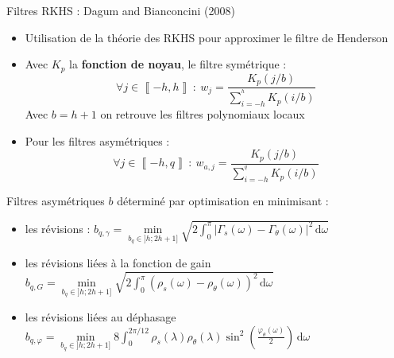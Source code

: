\documentclass[10pt,xcolor=table,color={dvipsnames,usenames},ignorenonframetext,usepdftitle=false,french]{beamer}
\providecommand{\tightlist}{%
  \setlength{\parskip}{0pt}
  }
\newcommand\1{\mathds{1}}
\newcommand\ud{\,\mathrm{d}}
\begin{document}
\begin{frame}{Filtres RKHS : Dagum and Bianconcini (2008)}
\protect\hypertarget{filtres-rkhs-dagum-and-bianconcini-2008}{}
\begin{itemize}
\tightlist
\item
  Utilisation de la théorie des RKHS pour approximer le filtre de
  Henderson
\end{itemize}

\begin{itemize}
\tightlist
\item
  Avec \(K_p\) la \textbf{fonction de noyau}, le filtre symétrique : \[
  \forall j\in\left\llbracket -h,h\right\rrbracket\::\: w_{j}=\frac{K_p(j/b)}{\sum_{i=-h}^{^h}K_p(i/b)}
  \] Avec \(b=h+1\) on retrouve les filtres polynomiaux locaux
\end{itemize}

\pause

\begin{itemize}
\tightlist
\item
  Pour les filtres asymétriques : \[
  \forall j\in\left\llbracket -h,q\right\rrbracket\::\: w_{a,j}=\frac{K_p(j/b)}{\sum_{i=-h}^{^q}K_p(i/b)}
  \]
\end{itemize}
\end{frame}

\begin{frame}{Filtres asymétriques}
\protect\hypertarget{filtres-asymuxe9triques}{}
\(b\) déterminé par optimisation en minimisant :

\begin{itemize}
\item
  les révisions :
  \(b_{q,\gamma}=\underset{b_q\in]h;2 h+1]}{\min} \sqrt{2\int_{0}^{\pi} \lvert \Gamma_s(\omega)-\Gamma_\theta(\omega)\rvert^2\ud \omega }\)
\item
  les révisions liées à la fonction de gain
  \(b_{q,G}=\underset{b_q\in]h;2 h+1]}{\min} \sqrt{2\int_{0}^{\pi} \left(\rho_s(\omega)-\rho_\theta(\omega)\right)^{2}\ud \omega }\)
\item
  les révisions liées au déphasage
  \(b_{q,\varphi}=\underset{b_q\in]h;2 h+1]}{\min} 8\int_{0}^{2\pi/12} \rho_s(\lambda)\rho_\theta(\lambda)\sin^{2}\left(\frac{\varphi_\theta(\omega)}{2}\right)\ud \omega\)
\end{itemize}
\end{frame}
\end{document}
